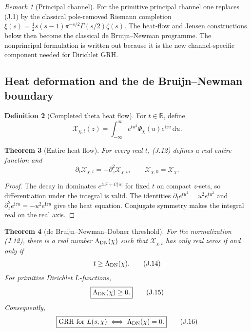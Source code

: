\documentclass[11pt]{article}
\newtheorem{theorem}{Theorem}[section]
\theoremstyle{definition}
\newtheorem{definition}[theorem]{Definition}
\theoremstyle{remark}
\newtheorem{remark}[theorem]{Remark}
\newcommand{\R}{\mathbb R}
\newcommand{\dd}{\mathrm d}
\begin{document}
\begin{remark}[Principal channel]
For the primitive principal channel one replaces \textup{(J.1)} by the
classical pole-removed Riemann completion
$\xi(s)=\tfrac12s(s-1)\pi^{-s/2}\Gamma(s/2)\zeta(s)$.  The heat-flow and
Jensen constructions below then become the classical de Bruijn--Newman
programme.  The nonprincipal formulation is written out because it is the
new channel-specific component needed for Dirichlet GRH.
\end{remark}

\subsection{Heat deformation and the de Bruijn--Newman boundary}

\begin{definition}[Completed theta heat flow]
\label{def:theta-heat}
For $t\in\R$, define
\[
 \boxed{
 \mathscr X_{\chi,t}(z)
 =\int_{-\infty}^{\infty}
  e^{tu^2}\Phi_\chi(u)e^{\mathrm i zu}\,\dd u.}
 \tag{J.12}
\]
\end{definition}

\begin{theorem}[Entire heat flow]
\label{thm:theta-heat-equation}
For every real $t$, \textup{(J.12)} defines a real entire function and
\[
 \boxed{
 \partial_t\mathscr X_{\chi,t}
 =-\partial_z^2\mathscr X_{\chi,t},
 \qquad
 \mathscr X_{\chi,0}=\mathscr X_\chi.}
 \tag{J.13}
\]
\end{theorem}

\begin{proof}
The decay in  dominates
$e^{tu^2+C|u|}$ for fixed $t$ on compact $z$-sets, so differentiation under
the integral is valid.  The identities
$\partial_te^{tu^2}=u^2e^{tu^2}$ and
$\partial_z^2e^{\mathrm i zu}=-u^2e^{\mathrm i zu}$ give the heat equation.
Conjugate symmetry makes the integral real on the real axis.
\end{proof}

\begin{theorem}[de Bruijn--Newman--Dobner threshold]
\label{thm:theta-DN}
For the normalization \textup{(J.12)}, there is a real number
$\Lambda_{\rm DN}(\chi)$ such that $\mathscr X_{\chi,t}$ has only real zeros
if and only if
\[
 t\ge\Lambda_{\rm DN}(\chi).
 \tag{J.14}
\]
For primitive Dirichlet $L$-functions,
\[
 \boxed{\Lambda_{\rm DN}(\chi)\ge0.}
 \tag{J.15}
\]
Consequently,
\[
 \boxed{
 \text{GRH for }L(s,\chi)
 \iff \Lambda_{\rm DN}(\chi)=0.}
 \tag{J.16}
\]
\end{theorem}
\end{document}
